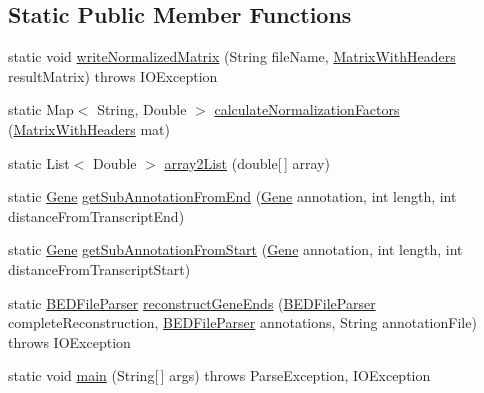 \subsection*{Static Public Member Functions}
\begin{DoxyCompactItemize}
\item 
static void \hyperlink{classumms_1_1esat_1_1_e_s_a_t_distance_calculator_ac118a1c8cb83450751f162aa01933165}{write\+Normalized\+Matrix} (String file\+Name, \hyperlink{classbroad_1_1core_1_1datastructures_1_1_matrix_with_headers}{Matrix\+With\+Headers} result\+Matrix)  throws I\+O\+Exception
\item 
static Map$<$ String, Double $>$ \hyperlink{classumms_1_1esat_1_1_e_s_a_t_distance_calculator_a82606cd46ae4f4570afac64befafb941}{calculate\+Normalization\+Factors} (\hyperlink{classbroad_1_1core_1_1datastructures_1_1_matrix_with_headers}{Matrix\+With\+Headers} mat)
\item 
static List$<$ Double $>$ \hyperlink{classumms_1_1esat_1_1_e_s_a_t_distance_calculator_ae04e6c798467dc11a0da7a31deed54ed}{array2\+List} (double\mbox{[}$\,$\mbox{]} array)
\item 
static \hyperlink{classumms_1_1core_1_1annotation_1_1_gene}{Gene} \hyperlink{classumms_1_1esat_1_1_e_s_a_t_distance_calculator_a8991dbfa8390362b7401aa10aa78a753}{get\+Sub\+Annotation\+From\+End} (\hyperlink{classumms_1_1core_1_1annotation_1_1_gene}{Gene} annotation, int length, int distance\+From\+Transcript\+End)
\item 
static \hyperlink{classumms_1_1core_1_1annotation_1_1_gene}{Gene} \hyperlink{classumms_1_1esat_1_1_e_s_a_t_distance_calculator_aa651a5a0773a942db8851c56201b1316}{get\+Sub\+Annotation\+From\+Start} (\hyperlink{classumms_1_1core_1_1annotation_1_1_gene}{Gene} annotation, int length, int distance\+From\+Transcript\+Start)
\item 
static \hyperlink{classbroad_1_1pda_1_1annotation_1_1_b_e_d_file_parser}{B\+E\+D\+File\+Parser} \hyperlink{classumms_1_1esat_1_1_e_s_a_t_distance_calculator_a5354877ab9ed2ccf0ef30006b066b01f}{reconstruct\+Gene\+Ends} (\hyperlink{classbroad_1_1pda_1_1annotation_1_1_b_e_d_file_parser}{B\+E\+D\+File\+Parser} complete\+Reconstruction, \hyperlink{classbroad_1_1pda_1_1annotation_1_1_b_e_d_file_parser}{B\+E\+D\+File\+Parser} annotations, String annotation\+File)  throws I\+O\+Exception
\item 
static void \hyperlink{classumms_1_1esat_1_1_e_s_a_t_distance_calculator_a0ce2ea3dc1e213a0f7fbd3c6dc558e21}{main} (String\mbox{[}$\,$\mbox{]} args)  throws Parse\+Exception, I\+O\+Exception 
\end{DoxyCompactItemize}
